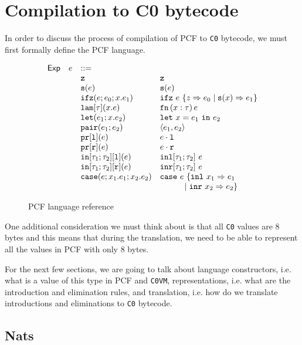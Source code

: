 \documentclass{acm_proc_article-sp}
\newcommand{\ccbi}{\texttt{C0} bytecode}
\begin{document}
\section{Compilation to {\secit C0} bytecode}
In order to discuss the process of compilation of PCF to \ccbi, we must first formally define the PCF language.
\begin{figure}[h]
\[
\begin{array}{c c l l}
\ms{Exp} & e     & ::= \\
	      &     &\zero                     & \zero\\
                &    & \suc(e)                   & \suc(e)\\
                &    & \ifz(e;e_0;x.e_1)         & \ifz ~e~ \{z \goesto e_0 \mid \suc(x) \goesto e_1\}\\
                &    & \lam[\tau](x.e)           & \irl{fn}\,(x : \tau)\,e\\
                &    & \letexp{x}{e_1}{e_2}      & \letbind{x}{e_1}{e_2} \\
                &    & \irl{pair}(e_1;e_2) & \pair{e_1}{e_2}\\
                &    & \irl{pr[l]}(e)        & e \cdot \irl{l}\\
                &    & \irl{pr[r]}(e)        & e \cdot \irl{r}\\
                &    & \inlt(e)        & \irl{inl}[\tau_1; \tau_2] ~e\\
                &    & \inrt(e)        & \irl{inr}[\tau_1; \tau_2] ~e\\
                &    & \ecase(e; x_1.e_1; x_2.e_2)  & \ecase~e~\{\irl{inl}~x_1 \goesto e_1 \\
                &	&	&~~~~~~~~~\mid \irl{inr}~x_2 \goesto e_2\}
\end{array}
\]
\caption{PCF language reference}
\end{figure}

One additional consideration we must think about is that all \texttt{C0} values are 8 bytes and this means that during the translation, we need to be able to represent all the values in PCF with only 8 bytes.

For the next few sections, we are going to talk about language constructors, i.e. what is a value of this type in PCF and \texttt{C0VM}, representations, i.e. what are the introduction and elimination rules, and translation, i.e. how do we translate introductions and eliminations to \ccbi.

\subsection{Nats}
\end{document}
